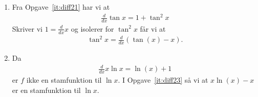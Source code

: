 \begin{enumerate}
	\item Fra Opgave~\ref{it:diff21} har vi at
	\begin{align*}
	\frac{d}{dx} \tan x=1+\tan^2 x
	\end{align*}
	Skriver vi $1=\frac{d}{dx}x$ og isolerer for $\tan^2x$ får vi at
	\begin{align*}
	\tan^2x=\frac{d}{dx} (\tan(x)-x).
	\end{align*}
	
	
	\item Da
	\begin{align*}
	\frac{d}{dx} x\ln x=\ln(x)+1
	\end{align*}
	er $f$ ikke en stamfunktion til $\ln x$. I Opgave~\ref{it:diff23} så vi at $x\ln(x)-x$ er en stamfunktion til $\ln x$.
	
	
	
\end{enumerate}